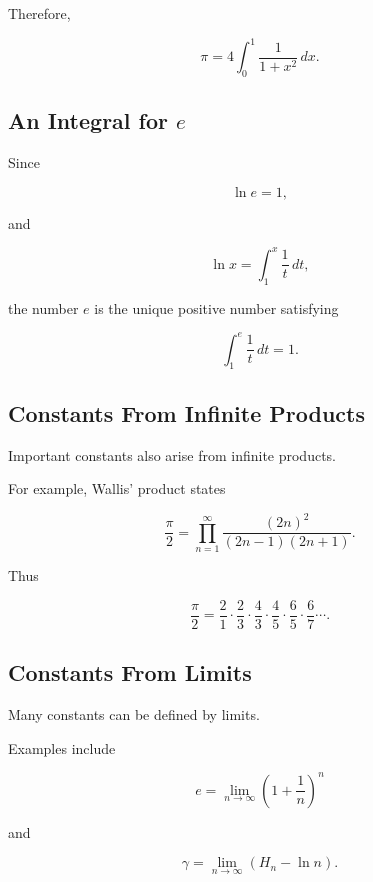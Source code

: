 Therefore,

\[
\boxed{
\pi
=
4
\int_0^1
\frac{1}{1+x^2}\,dx.
}
\]

\subsection{An Integral for \(e\)}
\label{subsec:e-integral-reference}

Since

\[
\ln e=1,
\]

and

\[
\ln x
=
\int_1^x
\frac{1}{t}\,dt,
\]

the number \(e\) is the unique positive number satisfying

\[
\boxed{
\int_1^e
\frac{1}{t}\,dt
=
1.
}
\]

\subsection{Constants From Infinite Products}
\label{subsec:constants-infinite-products}

Important constants also arise from infinite products.

For example, Wallis' product states

\[
\boxed{
\frac{\pi}{2}
=
\prod_{n=1}^{\infty}
\frac{(2n)^2}
{(2n-1)(2n+1)}.
}
\]

Thus

\[
\boxed{
\frac{\pi}{2}
=
\frac21
\cdot
\frac23
\cdot
\frac43
\cdot
\frac45
\cdot
\frac65
\cdot
\frac67
\cdots.
}
\]

\subsection{Constants From Limits}
\label{subsec:constants-from-limits}

Many constants can be defined by limits.

Examples include

\[
\boxed{
e
=
\lim_{n\to\infty}
\left(
1+\frac1n
\right)^n
}
\]

and

\[
\boxed{
\gamma
=
\lim_{n\to\infty}
\left(
H_n-\ln n
\right).
}
\]

